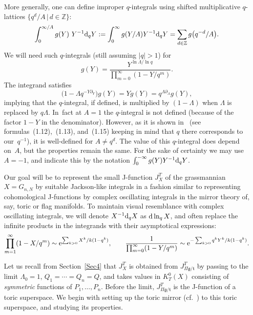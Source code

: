 \documentclass[pdftex]{sigma}
\numberwithin{equation}{section}
\def\ZZ{\mathbb Z}
\def\p{\partial}
\begin{document}
More generally, one can define improper $q$-integrals using shifted multiplicative
$q$-lattices $\big\{ q^d/A\, |\, d\in\ZZ\big\}$:
\[
\int_0^{\infty/A} g(Y)\ Y^{-1}{\rm d}_qY:=\int_0^{\infty}g(Y/A) Y^{-1}{\rm d}_q Y=\sum_{d\in\ZZ}g\big(q^{-d}/A\big).
\]
We will need such $q$-integrals (still assuming $|q|>1$) for
\[
g(Y)=\frac{Y^{\ln \Lambda/\ln q}}{\prod_{m=0}^{\infty}(1-Y/q^m)}.
\]
The integrand satisfies
\[
\big(1-\Lambda q^{-Y\p_Y}\big) g(Y) = Y g(Y) = q^{\Lambda\p_{\Lambda}} g(Y),
\]
implying that the $q$-integral, if defined, is multiplied by $(1-\Lambda)$ when $\Lambda$
is replaced by $q\Lambda$. In~fact at $A=1$ the $q$-integral is not defined (because of the factor $1-Y$ in the denominator). However, as it is shown in~\cite{DK}
(see formulas~(1.12),~(1.13), and~(1.15) keeping in mind that $q$ there corresponds to
our~$q^{-1}$), it is well-defined for $A\neq q^d$.
The value of this $q$-integral does depend on~$A$, but the properties remain the same.
For the sake of certainty we may use $A=-1$, and indicate this by the notation
$\int_0^{-\infty} g(Y) Y^{-1}{\rm d}_qY$.

Our goal will be to represent the small J-function $J_X^T$ of the grassmannian $X=G_{n,N}$ by suitable Jackson-like integrals in a fashion similar to representing cohomological J-functions by complex oscillating integrals in the mirror theory of, say, toric or flag manifolds. To maintain visual resemblance with complex oscillating integrals, we will denote $X^{-1}{\rm d}_q X$ as ${\rm d}\ln_q X$, and often replace the infinite products in the integrands
with their asymptotical expressions:
\begin{gather*}
\prod_{m=1}^{\infty}(1-X/q^m) \sim {\rm e}^{ \sum_{k>0}X^k/k(1-q^k)},
\qquad
\frac{1}{\prod_{m=0}^{\infty}(1-Y/q^m)} \sim {\rm e}^{ -\sum_{k>0}q^kY^k/k(1-q^k)}.
\end{gather*}

Let us recall from Section~\ref{Sec4} that $J^T_X$ is obtained from $J^T_{\Pi\mathfrak{g}/\mathfrak{t}}$ by passing to the limit $\Lambda_0=1$, $Q_1=\cdots=Q_n=Q$, and takes values in $K^0_T(X)$ consisting of {\em symmetric} functions of $P_1,\dots,P_n$. Before the limit, $J^T_{\Pi\mathfrak{g}/\mathfrak{t}}$ is the J-function of a toric superspace. We begin with setting up the toric mirror (cf.~\cite{Givental:perm6}) to this toric superspace, and studying its properties.
\end{document}
